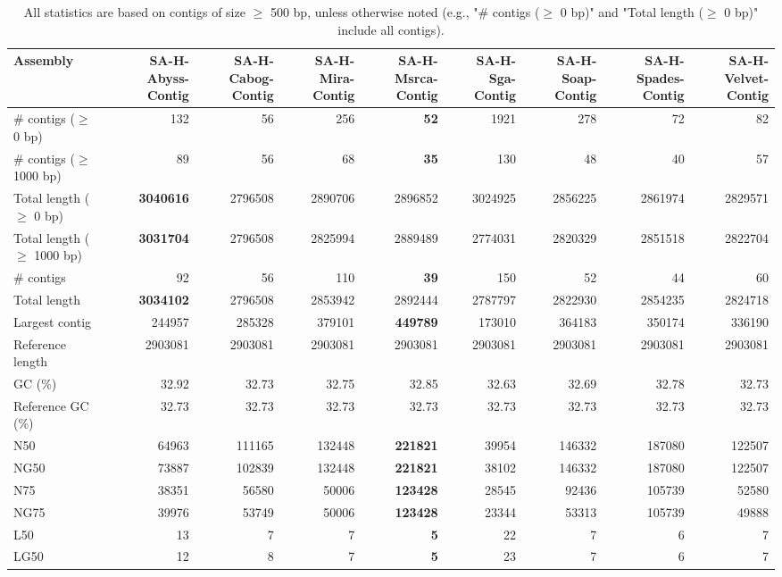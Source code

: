 \documentclass[12pt,a4paper]{article}
\begin{document}
\begin{table}[ht]
\begin{center}
\caption{All statistics are based on contigs of size $\geq$ 500 bp, unless otherwise noted (e.g., "\# contigs ($\geq$ 0 bp)" and "Total length ($\geq$ 0 bp)" include all contigs).}
\begin{tabular}{|l*{8}{|r}|}
\hline
Assembly & SA-H-Abyss-Contig & SA-H-Cabog-Contig & SA-H-Mira-Contig & SA-H-Msrca-Contig & SA-H-Sga-Contig & SA-H-Soap-Contig & SA-H-Spades-Contig & SA-H-Velvet-Contig \\ \hline
\# contigs ($\geq$ 0 bp) & 132 & 56 & 256 & {\bf 52} & 1921 & 278 & 72 & 82 \\ \hline
\# contigs ($\geq$ 1000 bp) & 89 & 56 & 68 & {\bf 35} & 130 & 48 & 40 & 57 \\ \hline
Total length ($\geq$ 0 bp) & {\bf 3040616} & 2796508 & 2890706 & 2896852 & 3024925 & 2856225 & 2861974 & 2829571 \\ \hline
Total length ($\geq$ 1000 bp) & {\bf 3031704} & 2796508 & 2825994 & 2889489 & 2774031 & 2820329 & 2851518 & 2822704 \\ \hline
\# contigs & 92 & 56 & 110 & {\bf 39} & 150 & 52 & 44 & 60 \\ \hline
Total length & {\bf 3034102} & 2796508 & 2853942 & 2892444 & 2787797 & 2822930 & 2854235 & 2824718 \\ \hline
Largest contig & 244957 & 285328 & 379101 & {\bf 449789} & 173010 & 364183 & 350174 & 336190 \\ \hline
Reference length & 2903081 & 2903081 & 2903081 & 2903081 & 2903081 & 2903081 & 2903081 & 2903081 \\ \hline
GC (\%) & 32.92 & 32.73 & 32.75 & 32.85 & 32.63 & 32.69 & 32.78 & 32.73 \\ \hline
Reference GC (\%) & 32.73 & 32.73 & 32.73 & 32.73 & 32.73 & 32.73 & 32.73 & 32.73 \\ \hline
N50 & 64963 & 111165 & 132448 & {\bf 221821} & 39954 & 146332 & 187080 & 122507 \\ \hline
NG50 & 73887 & 102839 & 132448 & {\bf 221821} & 38102 & 146332 & 187080 & 122507 \\ \hline
N75 & 38351 & 56580 & 50006 & {\bf 123428} & 28545 & 92436 & 105739 & 52580 \\ \hline
NG75 & 39976 & 53749 & 50006 & {\bf 123428} & 23344 & 53313 & 105739 & 49888 \\ \hline
L50 & 13 & 7 & 7 & {\bf 5} & 22 & 7 & 6 & 7 \\ \hline
LG50 & 12 & 8 & 7 & {\bf 5} & 23 & 7 & 6 & 7 \\ \hline

\end{tabular}
\end{center}
\end{table}
\end{document}
